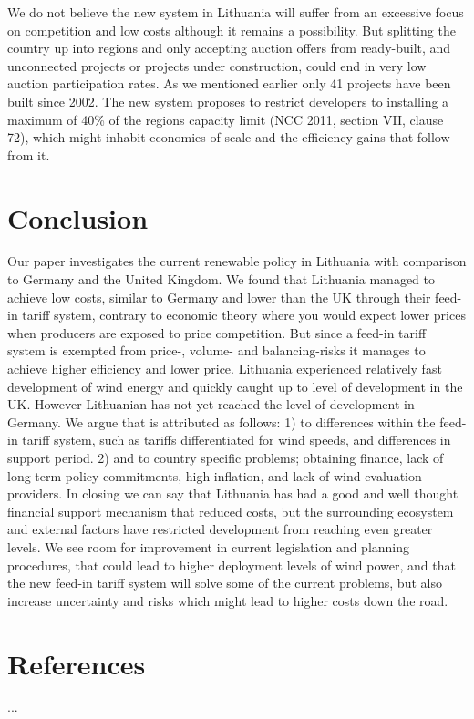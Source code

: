 \documentclass[a4paper, 12pt]{article}
\begin{document}
We do not believe the new system in Lithuania will suffer from an excessive focus on competition and low costs although it remains a possibility. But splitting the country up into regions and only accepting auction offers from ready-built, and unconnected projects or projects under construction, could end in very low auction participation rates. As we mentioned earlier only 41 projects have been built since 2002. The new system proposes to restrict developers to installing a maximum of 40\% of the regions capacity limit (NCC 2011, section VII, clause 72), which might inhabit economies of scale and the efficiency gains that follow from it.

\section{Conclusion}
Our paper investigates the current renewable policy in Lithuania with comparison to Germany and the United Kingdom. We found that Lithuania managed to achieve low costs, similar to Germany and lower than the UK through their feed-in tariff system, contrary to economic theory where you would expect lower prices when producers are exposed to price competition. But since a feed-in tariff system is exempted from price-, volume- and balancing-risks it manages to achieve higher efficiency and lower price. Lithuania experienced relatively fast development of wind energy and quickly caught up to level of development in the UK. However Lithuanian has not yet reached the level of development in Germany. We argue that is attributed as follows: 1) to differences within the feed-in tariff system, such as tariffs differentiated for wind speeds, and differences in support period. 2) and to country specific problems; obtaining finance, lack of long term policy commitments, high inflation, and lack of wind evaluation providers. In closing we can say that Lithuania has had a good and well thought financial support mechanism that reduced costs, but the surrounding ecosystem and external factors have restricted development from reaching even greater levels. We see room for improvement in current legislation and planning procedures, that could lead to higher deployment levels of wind power, and that the new feed-in tariff system will solve some of the current problems, but also increase uncertainty and risks which might lead to higher costs down the road.

\section{References}
...
\end{document}
